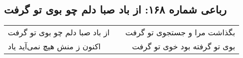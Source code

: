 \begin{center}
\section*{رباعی شماره ۱۶۸: از باد صبا دلم چو بوی تو گرفت}
\label{sec:sh168}
\begin{longtable}{l p{0.5cm} r}
از باد صبا دلم چو بوی تو گرفت
&&
بگذاشت مرا و جستجوی تو گرفت
\\
اکنون ز منش هیچ نمی‌آید یاد
&&
بوی تو گرفته بود خوی تو گرفت
\\
\end{longtable}
\end{center}
